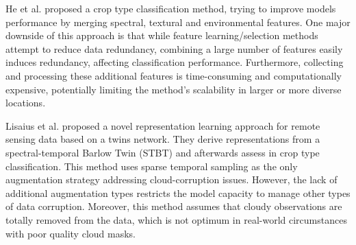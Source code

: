 \documentclass[journal,article,submit,pdftex,moreauthors]{Definitions/mdpi}
\begin{document}
He et al. \cite{He2022} proposed a crop type classification method, trying to improve models performance by merging spectral, textural and environmental features. One major downside of this approach is that while feature learning/selection methods attempt to reduce data redundancy, combining a large number of features easily induces redundancy, affecting classification performance. 
Furthermore, collecting and processing these additional features is time-consuming and computationally expensive, potentially limiting the method's scalability in larger or more diverse locations. 

Lisaius et al. \cite{Lisaius2024} proposed a novel representation learning approach for remote sensing data based on a twins network.
They derive representations from a spectral-temporal Barlow Twin (STBT) and afterwards assess in crop type classification. This method uses sparse temporal sampling as the only augmentation strategy addressing cloud-corruption issues. However, the lack of additional augmentation types restricts the model capacity to manage other types of data corruption. Moreover, this method assumes that cloudy observations are totally removed from the data, which is not optimum in real-world circumstances with poor quality cloud masks.
\end{document}
